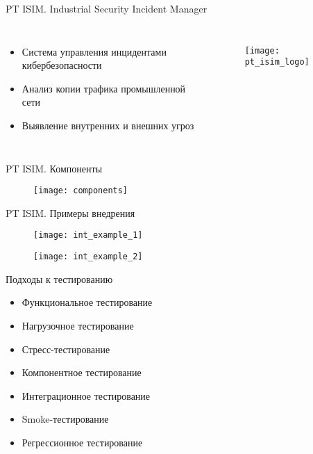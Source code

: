\begin{frame}{PT ISIM. Industrial Security Incident Manager}
    \begin{columns}
            \begin{itemize}
                \item Система управления инцидентами кибербезопасности
                \item Анализ копии трафика промышленной сети
                \item Выявление внутренних и внешних угроз
            \end{itemize}
            \begin{figure}[h!]
                \centering
                \texttt{[image: pt\_isim\_logo]}
                \label{img:pt_isim_logo}
            \end{figure}
    \end{columns}
\end{frame}

\begin{frame}{PT ISIM. Компоненты}

    \begin{figure}[h!]
        \centering
        \texttt{[image: components]}
        \label{img:components}
    \end{figure}
\end{frame}

\begin{frame}{PT ISIM. Примеры внедрения}
    \begin{figure}[h!]
        \centering
        \texttt{[image: int\_example\_1]}
        \label{img:int_example_1}
    \end{figure}
    \begin{figure}[h!]
        \centering
        \texttt{[image: int\_example\_2]}
        \label{img:int_example_2}
    \end{figure}
\end{frame}

\begin{frame}{Подходы к тестированию}
    \begin{itemize}
        \item Функциональное тестирование
        \item Нагрузочное тестирование
        \item Стресс-тестирование
        \item Компонентное тестирование
        \item Интеграционное тестирование
        \item Smoke-тестирование
        \item Регрессионное тестирование
    \end{itemize}
\end{frame}

